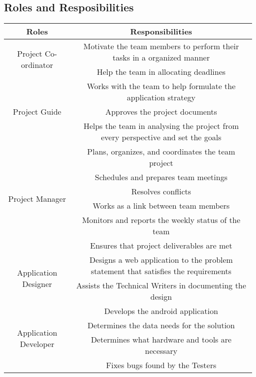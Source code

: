 \documentclass[10pt]{article}
\begin{document}
\newpage
\subsection{Roles and Resposibilities}
\begin{center}
	\begin{tabular} { |c|c|c| }
		\hline 
		\textbf{Roles}  & \multicolumn{2}{c|}{\textbf{Responsibilities}}\\ 
		\hline 
		\multirow{2}{6em}{Project Co-ordinator} & \multicolumn{2}{c|}{Motivate the team members to perform their tasks in a organized manner } \\  
		& \multicolumn{2}{c|}{Help the team in allocating deadlines} \\ 
		\hline
			\multirow{3}{6em}{Project Guide} & \multicolumn{2}{c|}{Works with the team to help formulate the application strategy} \\  
		& \multicolumn{2}{c|}{Approves the project documents} \\ 
		& \multicolumn{2}{c|}{Helps the team in analysing the project from every perspective and set the goals} \\
		\hline		
		\multirow{6}{6em}{Project Manager} & \multicolumn{2}{c|}{Plans, organizes, and coordinates the team project} \\  
		& \multicolumn{2}{c|}{Schedules and prepares team meetings} \\ 
	& \multicolumn{2}{c|}{Resolves conflicts} \\
	& \multicolumn{2}{c|}{Works as a link between team members} \\
	& \multicolumn{2}{c|}{Monitors and reports the weekly status of the team} \\
	& \multicolumn{2}{c|}{Ensures that project deliverables are met} \\
		\hline		
			\multirow{2}{6em}{Application Designer} & \multicolumn{2}{c|}{Designs a web application to the problem statement that satisfies the requirements} \\  
		& \multicolumn{2}{c|}{Assists the Technical Writers in documenting the design} \\ 
		\hline
		\multirow{4}{6em}{Application Developer} & \multicolumn{2}{c|}{Develops the android application} \\  
		& \multicolumn{2}{c|}{Determines the data needs for the solution} \\ 
		& \multicolumn{2}{c|}{Determines what hardware and tools are necessary} \\ 
		& \multicolumn{2}{c|}{Fixes bugs found by the Testers} \\ 

\end{tabular}
\end{center}
\end{document}
